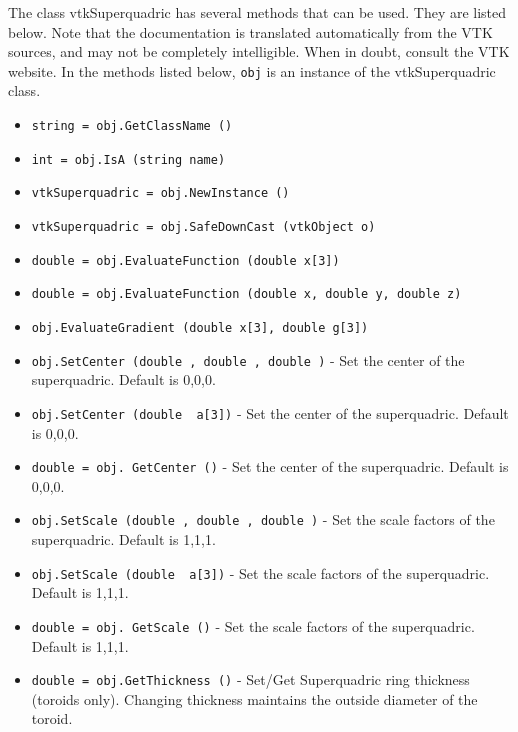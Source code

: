 The class vtkSuperquadric has several methods that can be used.
  They are listed below.
Note that the documentation is translated automatically from the VTK sources,
and may not be completely intelligible.  When in doubt, consult the VTK website.
In the methods listed below, \verb|obj| is an instance of the vtkSuperquadric class.
\begin{itemize}
\item  \verb|string = obj.GetClassName ()|

\item  \verb|int = obj.IsA (string name)|

\item  \verb|vtkSuperquadric = obj.NewInstance ()|

\item  \verb|vtkSuperquadric = obj.SafeDownCast (vtkObject o)|

\item  \verb|double = obj.EvaluateFunction (double x[3])|

\item  \verb|double = obj.EvaluateFunction (double x, double y, double z)|

\item  \verb|obj.EvaluateGradient (double x[3], double g[3])|

\item  \verb|obj.SetCenter (double , double , double )| -  Set the center of the superquadric. Default is 0,0,0.

\item  \verb|obj.SetCenter (double  a[3])| -  Set the center of the superquadric. Default is 0,0,0.

\item  \verb|double = obj. GetCenter ()| -  Set the center of the superquadric. Default is 0,0,0.

\item  \verb|obj.SetScale (double , double , double )| -  Set the scale factors of the superquadric. Default is 1,1,1.

\item  \verb|obj.SetScale (double  a[3])| -  Set the scale factors of the superquadric. Default is 1,1,1.

\item  \verb|double = obj. GetScale ()| -  Set the scale factors of the superquadric. Default is 1,1,1.

\item  \verb|double = obj.GetThickness ()| -  Set/Get Superquadric ring thickness (toroids only).
 Changing thickness maintains the outside diameter of the toroid.


\end{itemize}

